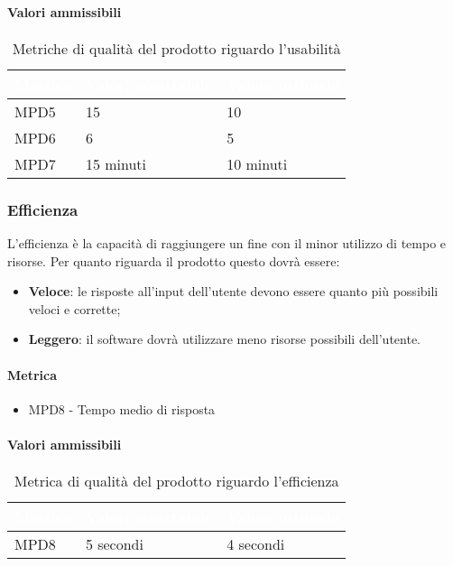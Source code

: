 \paragraph{Valori ammissibili}
\renewcommand{\arraystretch}{1.5}
\begin{longtable}{C{2.5cm} C{4cm} C{4cm}}
\textcolor{white}{\textbf{Metrica}}&
\textcolor{white}{\textbf{Valori accettabile}}&
\textcolor{white}{\textbf{Valore ottimale}}\\	
\endhead
\endfoot
{}\caption{Metriche di qualità del prodotto riguardo l'usabilità}
\endlastfoot
		MPD5 &  
		15 &
		10 \\		
		MPD6 &  
		6 &
		5 \\
		MPD7 &  
		15 minuti &
		10 minuti\\
\end{longtable}
\subsubsection{Efficienza}
L'efficienza è la capacità di raggiungere un fine con il minor utilizzo di tempo e risorse. Per quanto riguarda il prodotto questo dovrà essere:
\begin{itemize}
\item \textbf{Veloce}: le risposte all'input dell'utente devono essere quanto più possibili veloci e corrette;
\item \textbf{Leggero}: il software dovrà utilizzare meno risorse possibili dell'utente.
\end{itemize}
\paragraph{Metrica}
\begin{itemize}
\item MPD8 - Tempo medio di risposta
\end{itemize}
\paragraph{Valori ammissibili}
\renewcommand{\arraystretch}{1.5}
\begin{longtable}{C{2.5cm} C{4cm} C{4cm}}
\textcolor{white}{\textbf{Metrica}}&
\textcolor{white}{\textbf{Valori accettabile}}&
\textcolor{white}{\textbf{Valore ottimale}}\\	
\endhead
\endfoot
{}\caption{Metrica di qualità del prodotto riguardo l'efficienza}
\endlastfoot
		MPD8 &  
		5 secondi &
		4 secondi \\
\end{longtable}
